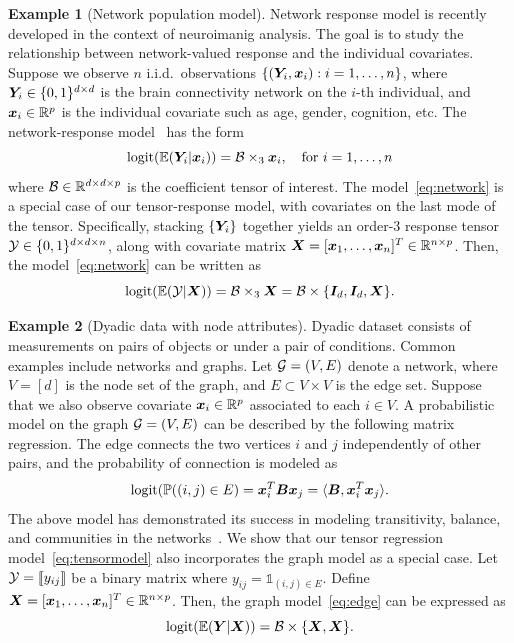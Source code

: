 \documentclass{article}
\theoremstyle{plain}
\theoremstyle{definition}
\newtheorem{example}{Example}
\begin{document}
\begin{example}[Network population model] 
Network response model is recently developed in the context of neuroimanig analysis. The goal is to study the relationship between network-valued response and the individual covariates. Suppose we observe $n$ i.i.d.\ observations $\{(\bm Y_i, \bm x_i): i=1,\ldots,n\}$, where $\bm Y_i\in\{0,1\}^{d\times d}$ is the brain connectivity network on the $i$-th individual, and $\bm x_i\in\mathbb{R}^p$ is the individual covariate such as age, gender, cognition, etc. The network-response model~\cite{rabusseau2016low, zhang2018network} has the form
\begin{equation}\label{eq:network}
\text{logit}(\mathbb{E}(\bm Y_i|\bm x_i))=\mathcal{B}\times_3\bm x_i, \quad \text{for }i=1,\ldots,n
\end{equation}
where $\mathcal{B}\in \mathbb{R}^{d\times d\times p}$ is the coefficient tensor of interest. The model~\eqref{eq:network} is a special case of our tensor-response model, with covariates on the last mode of the tensor. Specifically, stacking $\{\bm Y_i\}$ together
yields an order-3 response tensor $\mathcal{Y}\in\{0,1\}^{d\times d\times n}$, along with covariate matrix $\bm X=[\bm x_1,\ldots,\bm x_n]^T\in\mathbb{R}^{n\times p}$. Then, the model~\eqref{eq:network} can be written as
\[
\text{logit}(\mathbb{E}(\mathcal{Y}|\bm X))=\mathcal{B}\times_3 \bm X=\mathcal{B}\times\{\bm I_d, \bm I_d, \bm X\}.
\]
 \end{example}


 \begin{example}[Dyadic data with node attributes] Dyadic dataset consists of measurements on pairs of objects or under a pair of conditions. Common examples include networks and graphs. Let $\mathcal{G}=(V,E)$ denote a network, where $V=[d]$ is the node set of the graph, and $E\subset V\times V$ is the edge set. Suppose that we also observe covariate $\bm x_i\in\mathbb{R}^p$ associated to each $i\in V$. A probabilistic model on the graph $\mathcal{G}=(V,E)$ can be described by the following matrix regression. The edge connects the two vertices $i$ and $j$ independently of other pairs, and the probability of connection is modeled as
\begin{equation}\label{eq:edge}
 \text{logit}(\mathbb{P}((i,j)\in E)=\bm x^T_i\bm B\bm x_j=\langle \bm B, \bm x^T_i\bm x_j\rangle.
 \end{equation}
The above model has demonstrated its success in modeling transitivity, balance, and communities in the networks~\cite{hoff2005bilinear}. We show that our tensor regression model~\eqref{eq:tensormodel} also incorporates the graph model as a special case. Let $\mathcal{Y}=\llbracket y_{ij} \rrbracket$ be a binary matrix where $y_{ij}=\mathds{1}_{(i,j)\in E}$. Define $\bm X=[\bm x_1,\ldots,\bm x_n]^T\in\mathbb{R}^{n\times p}$. Then, the graph model~\eqref{eq:edge} can be expressed as
 \[
 \text{logit}(\mathbb{E}(\bm Y|\bm X))=\mathcal{B}\times\{\bm X,\bm X\}.
 \]
\end{example}
\end{document}
